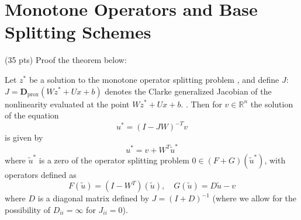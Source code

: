 \section{Monotone Operators and Base Splitting Schemes}
{\color{red} (35 pts)} Proof the theorem below:
\begin{theorem}
Let \(z^*\) be a solution to the monotone operator splitting problem , and define \(J\): $J = \mathbf{D}_{\text{prox}}(Wz^* + Ux + b)$ denotes the Clarke generalized Jacobian of the nonlinearity evaluated at the point \(Wz^* + Ux + b\).
. Then for \(v \in \mathbb{R}^n\) the solution of the equation
\begin{equation}
u^* = (I - JW)^{-T}v
\end{equation}
is given by
\begin{equation}
u^* = v + W^T\tilde{u}^*
\end{equation}
where \(\tilde{u}^*\) is a zero of the operator splitting problem \(0 \in (F + G)(\tilde{u}^*)\), with operators defined as
\begin{equation}
F(\tilde{u}) = (I - W^T)(\tilde{u}), \quad G(\tilde{u}) = D\tilde{u} - v
\end{equation}
where \(D\) is a diagonal matrix defined by \(J = (I + D)^{-1}\) (where we allow for the possibility of \(D_{ii} = \infty\) for \(J_{ii} = 0\)).
\end{theorem}

\solution{}





